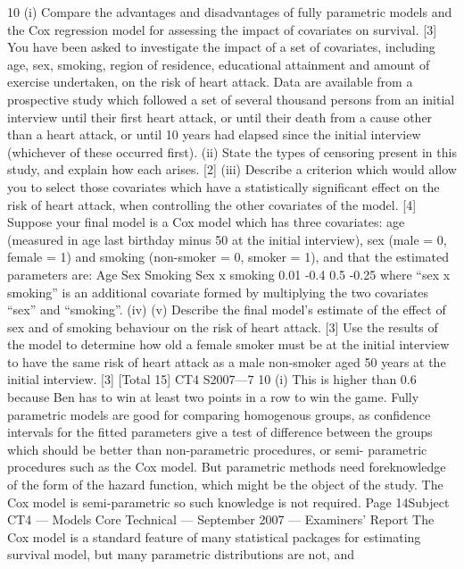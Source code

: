 \documentclass[a4paper,12pt]{article}
\begin{document}
\begin{enumerate}
10
(i)
Compare the advantages and disadvantages of fully parametric models and the
Cox regression model for assessing the impact of covariates on survival. [3]
You have been asked to investigate the impact of a set of covariates, including age,
sex, smoking, region of residence, educational attainment and amount of exercise
undertaken, on the risk of heart attack. Data are available from a prospective study
which followed a set of several thousand persons from an initial interview until their
first heart attack, or until their death from a cause other than a heart attack, or until 10
years had elapsed since the initial interview (whichever of these occurred first).
(ii) State the types of censoring present in this study, and explain how each arises.
[2]
(iii) Describe a criterion which would allow you to select those covariates which
have a statistically significant effect on the risk of heart attack, when
controlling the other covariates of the model.
[4]
Suppose your final model is a Cox model which has three covariates: age (measured
in age last birthday minus 50 at the initial interview), sex (male = 0, female = 1) and
smoking (non-smoker = 0, smoker = 1), and that the estimated parameters are:
Age
Sex
Smoking
Sex x smoking
0.01
-0.4
0.5
-0.25
where “sex x smoking” is an additional covariate formed by multiplying the two
covariates “sex” and “smoking”.
(iv)
(v)
Describe the final model’s estimate of the effect of sex and of smoking
behaviour on the risk of heart attack.
[3]
Use the results of the model to determine how old a female smoker must be at
the initial interview to have the same risk of heart attack as a male non-smoker
aged 50 years at the initial interview.
[3]
[Total 15]
CT4 S2007—7
10
(i)
This is higher than 0.6 because Ben has to win at least two points in a
row to win the game.
Fully parametric models are good for comparing homogenous groups, as
confidence intervals for the fitted parameters give a test of difference between
the groups which should be better than non-parametric procedures, or semi-
parametric procedures such as the Cox model.
But parametric methods need foreknowledge of the form of the hazard
function, which might be the object of the study.
The Cox model is semi-parametric so such knowledge is not required.
Page 14Subject CT4 — Models Core Technical — September 2007 — Examiners’ Report
The Cox model is a standard feature of many statistical packages for
estimating survival model, but many parametric distributions are not, and

\end{enumerate}
\end{document}
